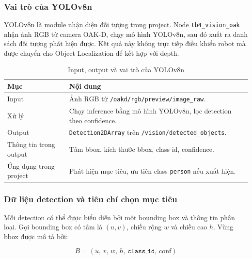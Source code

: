 \subsubsection{Vai trò của YOLOv8n}
\label{subsubsec:yolov8n-role}

YOLOv8n là module nhận diện đối tượng trong project. Node \texttt{tb4\_vision\_oak} nhận ảnh RGB từ camera OAK-D, chạy mô hình YOLOv8n, sau đó xuất ra danh sách đối tượng phát hiện được. Kết quả này không trực tiếp điều khiển robot mà được chuyển cho Object Localization để kết hợp với depth.

\begin{table}[H]
    \centering
    \caption{Input, output và vai trò của YOLOv8n}
    \label{tab:yolov8n-role}
    \renewcommand{\arraystretch}{1.25}
    \small
    \begin{tabularx}{\textwidth}{|>{\raggedright\arraybackslash}p{}|>{\raggedright\arraybackslash}X|}
        \hline
        \textbf{Mục} & \textbf{Nội dung} \\
        \hline
        Input & Ảnh RGB từ \texttt{/oakd/rgb/preview/image\_raw}. \\
        \hline
        Xử lý & Chạy inference bằng mô hình YOLOv8n, lọc detection theo confidence. \\
        \hline
        Output & \texttt{Detection2DArray} trên \texttt{/vision/detected\_objects}. \\
        \hline
        Thông tin trong output & Tâm bbox, kích thước bbox, class id, confidence. \\
        \hline
        Ứng dụng trong project & Phát hiện mục tiêu, ưu tiên class \texttt{person} nếu xuất hiện. \\
        \hline
    \end{tabularx}
\end{table}

\subsubsection{Dữ liệu detection và tiêu chí chọn mục tiêu}
\label{subsubsec:detection-selection}

Mỗi detection có thể được biểu diễn bởi một bounding box và thông tin phân loại. Gọi bounding box có tâm là $(u, v)$, chiều rộng $w$ và chiều cao $h$. Vùng bbox được mô tả bởi:

\begin{equation}
    B = \left(u,\, v,\, w,\, h,\, \texttt{class\_id},\, \mathrm{conf}\right)
    \label{eq:bbox-format}
\end{equation}

